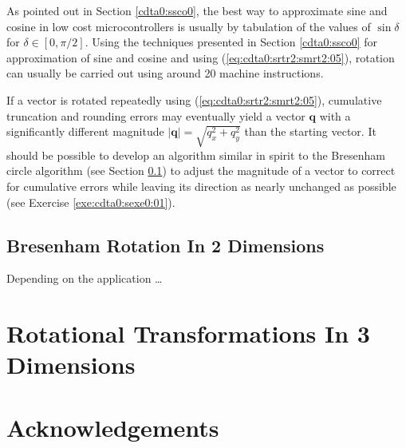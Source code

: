 As pointed out in Section \ref{cdta0:ssco0}, the best way to approximate
sine and cosine in low cost microcontrollers is usually by tabulation of the 
values of $\sin \delta$ for $\delta \in [0, \pi/2]$.  Using the 
techniques presented in Section \ref{cdta0:ssco0} for approximation of
sine and cosine and using (\ref{eq:cdta0:srtr2:smrt2:05}), rotation can usually
be carried out using around 20 machine instructions.

If a vector is rotated repeatedly using (\ref{eq:cdta0:srtr2:smrt2:05}), cumulative
truncation and rounding errors may eventually yield a vector 
$\mathbf{q}$ with a significantly different
magnitude $|\mathbf{q}| = \sqrt{q_x^2 + q_y^2}$ than the starting vector.
It should be possible to develop an algorithm similar in spirit to the 
Bresenham circle algorithm (see Section \ref{cdta0:srtr2:sbrt2}) to
adjust the magnitude of a vector to correct for cumulative 
errors while leaving its direction as nearly unchanged
as possible (see Exercise \ref{exe:cdta0:sexe0:01}).


\subsection{Bresenham Rotation In 2 Dimensions}
\label{cdta0:srtr2:sbrt2}

Depending on the application \ldots{}

\section{Rotational Transformations In 3 Dimensions}
\label{cdta0:srtr3}



\section{Acknowledgements}
\label{cdta0:sack0}


